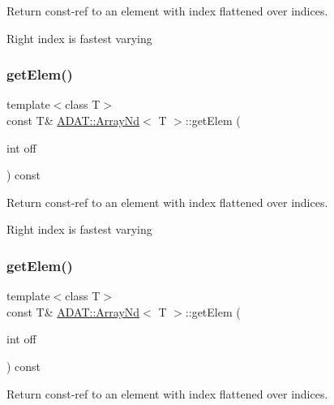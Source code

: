 Return const-\/ref to an element with index flattened over indices. 

Right index is fastest varying \mbox{\label{classADAT_1_1ArrayNd_a515368f71387996ee237309eb1f0cc2e}} 
\subsubsection{\texorpdfstring{getElem()}{getElem()}\hspace{0.1cm}{\footnotesize\ttfamily [5/6]}}
{\footnotesize\ttfamily template$<$class T$>$ \\
const T\& \mbox{\hyperlink{classADAT_1_1ArrayNd}{A\+D\+A\+T\+::\+Array\+Nd}}$<$ T $>$\+::get\+Elem (\begin{DoxyParamCaption}\item[{int}]{off }\end{DoxyParamCaption}) const\hspace{0.3cm}{\ttfamily [inline]}}



Return const-\/ref to an element with index flattened over indices. 

Right index is fastest varying \mbox{\label{classADAT_1_1ArrayNd_a515368f71387996ee237309eb1f0cc2e}} 
\subsubsection{\texorpdfstring{getElem()}{getElem()}\hspace{0.1cm}{\footnotesize\ttfamily [6/6]}}
{\footnotesize\ttfamily template$<$class T$>$ \\
const T\& \mbox{\hyperlink{classADAT_1_1ArrayNd}{A\+D\+A\+T\+::\+Array\+Nd}}$<$ T $>$\+::get\+Elem (\begin{DoxyParamCaption}\item[{int}]{off }\end{DoxyParamCaption}) const\hspace{0.3cm}{\ttfamily [inline]}}



Return const-\/ref to an element with index flattened over indices. 

